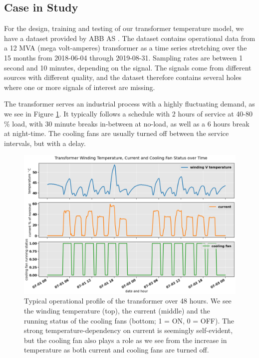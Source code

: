 \documentclass[]{article}
\begin{document}
\subsection{Case in Study} \label{sec:case-description}
For the design, training and testing of our transformer temperature model, we have a dataset provided by ABB AS \cite{abb-url}. The dataset contains operational data from a 12 MVA (mega volt-amperes) transformer as a time series stretching over the 15 months from 2018-06-04 through 2019-08-31. Sampling rates are between 1 second and 10 minutes, depending on the signal. The signals come from different sources with different quality, and the dataset therefore contains several holes where one or more signals of interest are missing.

The transformer serves an industrial process with a highly fluctuating demand, as we see in Figure \ref{fig:temp-current-aux}. It typically follows a schedule with 2 hours of service at 40-80 \% load, with 30 minute breaks in-between at no-load, as well as a 6 hours break at night-time. The cooling fans are usually turned off between the service intervals, but with a delay.

\begin{figure}[!h]
	\centering
	\includegraphics[width=1\linewidth]{./figs/temp-current-aux.png}
	\caption{Typical operational profile of the transformer over 48 hours. We see the winding temperature (top), the current (middle) and the running status of the cooling fans (bottom; 1 = ON, 0 = OFF). The strong temperature-dependency on current is seemingly self-evident, but the cooling fan also plays a role as we see from the increase in temperature as both current and cooling fans are turned off.}
	\label{fig:temp-current-aux}
\end{figure}
\end{document}
